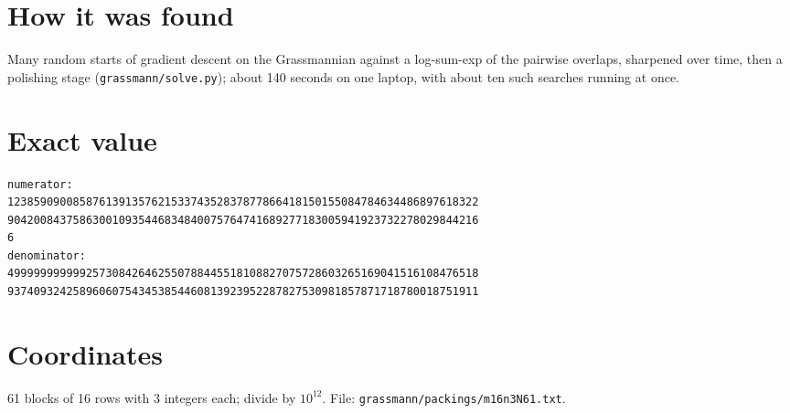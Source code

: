 \documentclass[11pt,a4paper]{article}
\begin{document}
\section{How it was found}
Many random starts of gradient descent on the Grassmannian against a log-sum-exp of the pairwise overlaps, sharpened over time, then a polishing stage (\texttt{grassmann/solve.py}); about 140 seconds on one laptop, with about ten such searches running at once.


\appendix
\section{Exact value}
{\small
\begin{verbatim}
numerator:
123859090085876139135762153374352837877866418150155084784634486897618322
904200843758630010935446834840075764741689277183005941923732278029844216
6
denominator:
499999999999257308426462550788445518108827075728603265169041516108476518
937409324258960607543453854460813923952287827530981857871718780018751911
\end{verbatim}}

\section{Coordinates}
61 blocks of 16 rows with 3 integers each; divide by $10^{12}$. File: \texttt{grassmann/packings/m16n3N61.txt}.
{\tiny
\begin{multicols}{3}
\end{multicols}}
\end{document}
